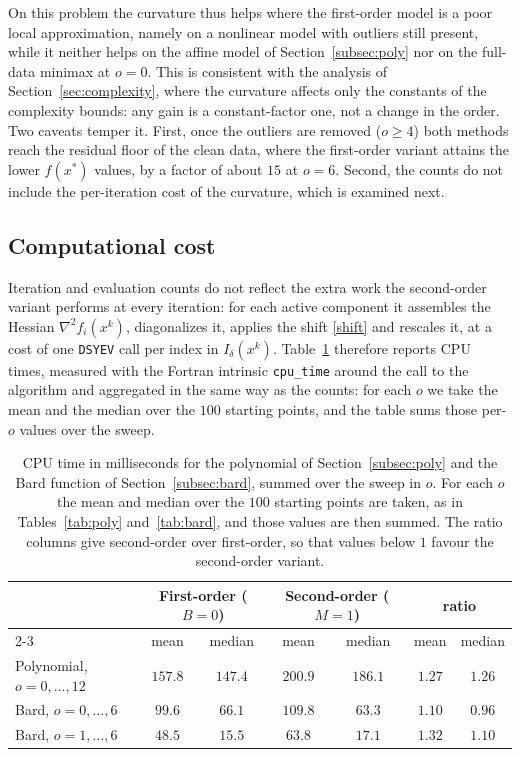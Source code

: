 \documentclass[11pt]{article}
\newcounter{alg}[section]
\begin{document}
On this problem the curvature thus helps where the first-order model is a poor
local approximation, namely on a nonlinear model with outliers still present,
while it neither helps on the affine model of Section~\ref{subsec:poly} nor on the
full-data minimax at $o = 0$. This is consistent with the analysis of
Section~\ref{sec:complexity}, where the curvature affects only the constants of
the complexity bounds: any gain is a constant-factor one, not a change in the
order. Two caveats temper it. First, once the outliers are removed ($o \ge 4$)
both methods reach the residual floor of the clean data, where the first-order
variant attains the lower $f(x^*)$ values, by a factor of about $15$ at $o = 6$.
Second, the counts do not include the per-iteration cost of the curvature,
which is examined next.

\subsection{Computational cost} \label{subsec:time}

Iteration and evaluation counts do not reflect the extra work the second-order
variant performs at every iteration: for each active component it assembles the
Hessian $\nabla^2 f_i(x^k)$, diagonalizes it, applies the shift \eqref{shift}
and rescales it, at a cost of one \texttt{DSYEV} call per index in
$I_\delta(x^k)$. Table~\ref{tab:time} therefore reports CPU times, measured with
the Fortran intrinsic \texttt{cpu\_time} around the call to the algorithm and
aggregated in the same way as the counts: for each $o$ we take the mean and the
median over the $100$ starting points, and the table sums those per-$o$ values
over the sweep.

\begin{table}[ht!]
\centering
\begin{tabular}{l cc cc cc}
\hline
 & \multicolumn{2}{c}{First-order ($B=0$)}
 & \multicolumn{2}{c}{Second-order ($M=1$)}
 & \multicolumn{2}{c}{ratio} \\
\cline{2-3}\cline{4-5}\cline{6-7}
 & mean & median & mean & median & mean & median \\
\hline
Polynomial, $o=0,\dots,12$
  & $157.8$ & $147.4$ & $200.9$ & $186.1$ & $1.27$ & $1.26$ \\
Bard, $o=0,\dots,6$
  & $99.6$ & $66.1$ & $109.8$ & $63.3$ & $1.10$ & $0.96$ \\
Bard, $o=1,\dots,6$
  & $48.5$ & $15.5$ & $63.8$ & $17.1$ & $1.32$ & $1.10$ \\
\hline
\end{tabular}
\caption{CPU time in milliseconds for the polynomial of
Section~\ref{subsec:poly} and the Bard function of Section~\ref{subsec:bard},
summed over the sweep in $o$. For each $o$
the mean and median over the $100$ starting points are taken, as in
Tables~\ref{tab:poly} and~\ref{tab:bard}, and those values are then summed. The
ratio columns give second-order over first-order, so that values below $1$
favour the second-order variant.}
\label{tab:time}
\end{table}
\end{document}
